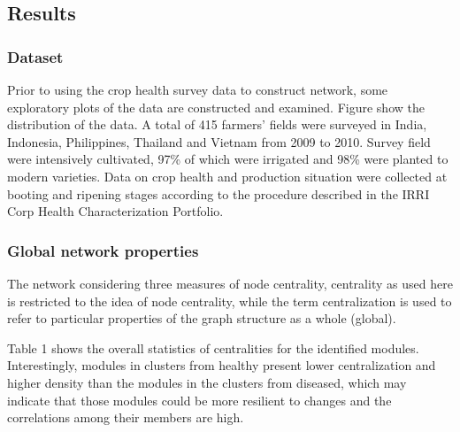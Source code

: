 \subsection{Results}

\subsubsection{Dataset}

Prior to using the crop health survey data to construct network, some exploratory plots of the data are constructed and examined. Figure show the distribution of the data. A total of 415 farmers' fields were surveyed in India, Indonesia, Philippines, Thailand and Vietnam from 2009 to 2010. Survey field were intensively cultivated, 97\% of which were irrigated and 98\% were planted to modern varieties. Data on crop health and production situation were collected at booting and ripening stages according to the procedure described in the IRRI Corp Health Characterization Portfolio\cite{Savary_2009_Survey}. 

%

\subsubsection*{Global network properties}

The network considering three measures of node centrality, centrality as used here is restricted to the idea of node centrality, while the term centralization is used to refer to particular properties of the graph structure as a whole (global).

Table 1 shows the overall statistics of centralities for the identified modules. Interestingly, modules in clusters from healthy  present lower centralization and higher density than the modules in the clusters from diseased, which may indicate that those modules could be more resilient to changes and the correlations among their members are high.

